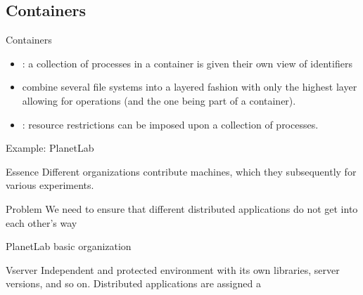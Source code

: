 \subsection{Containers}
\begin{slide}{Containers}
  \begin{centerfig}
  \end{centerfig}

  \begin{itemize}\tightlist
  \item {}: a collection of processes in a container is given their own view of identifiers
  \item {} combine several file systems into a layered fashion with only the highest
    layer allowing for  operations (and the one being part of a container).
  \item {}: resource restrictions can be imposed upon a collection of processes.
  \end{itemize}
\end{slide}
  \begin{slide}{Example: PlanetLab}
    \begin{block}{Essence} 
      Different organizations contribute machines, which they subsequently  for various experiments.
    \end{block}
    \begin{alertblock}{Problem} 
      We need to ensure that different distributed applications do not get into each other's way
      \mathexpr{\Rightarrow} 
    \end{alertblock}
  \end{slide}
  \begin{slide}{PlanetLab basic organization}
    \begin{centerfig}
    \end{centerfig}
  \begin{block}{Vserver}
    Independent and protected environment with its own libraries, server versions, and so on. Distributed
    applications are assigned a  
  \end{block}
  \end{slide}
